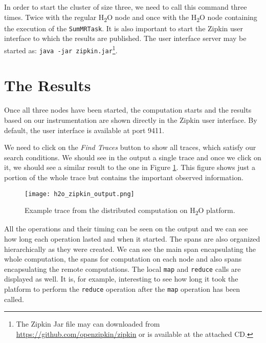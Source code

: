 In order to start the cluster of size three, we need to call this command three times. Twice with the regular H\textsubscript{2}O node and once with the H\textsubscript{2}O node containing the execution of the \texttt{SumMRTask}. It is also important to start the Zipkin user interface to which the results are published. The user interface server may be started as: \texttt{java -jar zipkin.jar}\footnote{The Zipkin Jar file may can downloaded from \url{https://github.com/openzipkin/zipkin} or is available at the attached CD.}.
\section{The Results}
Once all three nodes have been started, the computation starts and the results based on our instrumentation are shown directly in the Zipkin user interface. By default, the user interface is available at port 9411.

We need to click on the \textit{Find Traces} button to show all traces, which satisfy our search conditions. We should see in the output a single trace and once we click on it, we should see a similar result to the one in Figure \ref{h2o_zipkin_output}. This figure shows just a portion of the whole trace but contains the important observed information.
	\begin{figure}
		\centering
		\texttt{[image: h2o\_zipkin\_output.png]}
		\caption{Example trace from the distributed computation on H\textsubscript{2}O platform.}
		\label{h2o_zipkin_output}
	\end{figure}

All the operations and their timing can be seen on the output and we can see how long each operation lasted and when it started. The spans are also organized hierarchically as they were created. We can see the main span encapsulating the whole computation, the spans for computation on each node and also spans encapsulating the remote computations. The local \texttt{map} and \texttt{reduce} calls are displayed as well. It is, for example, interesting to see how long it took the platform to perform the \texttt{reduce} operation after the \texttt{map} operation has been called.